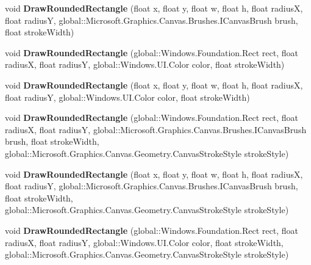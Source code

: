 \begin{DoxyCompactItemize}
void {\bfseries Draw\+Rounded\+Rectangle} (float x, float y, float w, float h, float radiusX, float radiusY, global\+::\+Microsoft.\+Graphics.\+Canvas.\+Brushes.\+I\+Canvas\+Brush brush, float stroke\+Width)
\item 
\mbox{\label{class_microsoft_1_1_graphics_1_1_canvas_1_1_canvas_drawing_session_a9204fb7281dd18db23c2b82bfe93b12e}} 
void {\bfseries Draw\+Rounded\+Rectangle} (global\+::\+Windows.\+Foundation.\+Rect rect, float radiusX, float radiusY, global\+::\+Windows.\+U\+I.\+Color color, float stroke\+Width)
\item 
\mbox{\label{class_microsoft_1_1_graphics_1_1_canvas_1_1_canvas_drawing_session_ac3b21bf0fd13d6deeccfb6ee5843eedc}} 
void {\bfseries Draw\+Rounded\+Rectangle} (float x, float y, float w, float h, float radiusX, float radiusY, global\+::\+Windows.\+U\+I.\+Color color, float stroke\+Width)
\item 
\mbox{\label{class_microsoft_1_1_graphics_1_1_canvas_1_1_canvas_drawing_session_a247f566adb4e90125681518025faef0b}} 
void {\bfseries Draw\+Rounded\+Rectangle} (global\+::\+Windows.\+Foundation.\+Rect rect, float radiusX, float radiusY, global\+::\+Microsoft.\+Graphics.\+Canvas.\+Brushes.\+I\+Canvas\+Brush brush, float stroke\+Width, global\+::\+Microsoft.\+Graphics.\+Canvas.\+Geometry.\+Canvas\+Stroke\+Style stroke\+Style)
\item 
\mbox{\label{class_microsoft_1_1_graphics_1_1_canvas_1_1_canvas_drawing_session_ab184d8260f42bc55d595aeb5bf73d38d}} 
void {\bfseries Draw\+Rounded\+Rectangle} (float x, float y, float w, float h, float radiusX, float radiusY, global\+::\+Microsoft.\+Graphics.\+Canvas.\+Brushes.\+I\+Canvas\+Brush brush, float stroke\+Width, global\+::\+Microsoft.\+Graphics.\+Canvas.\+Geometry.\+Canvas\+Stroke\+Style stroke\+Style)
\item 
\mbox{\label{class_microsoft_1_1_graphics_1_1_canvas_1_1_canvas_drawing_session_a3756840b08809835506655a6b68d93a3}} 
void {\bfseries Draw\+Rounded\+Rectangle} (global\+::\+Windows.\+Foundation.\+Rect rect, float radiusX, float radiusY, global\+::\+Windows.\+U\+I.\+Color color, float stroke\+Width, global\+::\+Microsoft.\+Graphics.\+Canvas.\+Geometry.\+Canvas\+Stroke\+Style stroke\+Style)

\end{DoxyCompactItemize}
